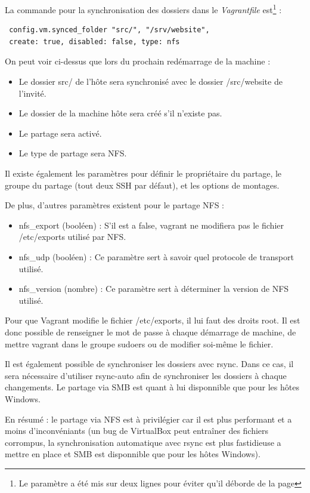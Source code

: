 \documentclass[12pt,a4paper]{article}
\begin{document}
La commande pour la synchronisation des dossiers dans le \textit{Vagrantfile} est\footnote{Le paramètre a été mis sur deux lignes pour éviter qu'il déborde de la page} :
\begin{lstlisting}
 config.vm.synced_folder "src/", "/srv/website", 
 create: true, disabled: false, type: nfs
\end{lstlisting}
On peut voir ci-dessus que lors du prochain redémarrage de la machine :
\begin{itemize}
	\item{Le dossier src/ de l'hôte sera synchronisé avec le dossier /src/website de l'invité.}
	\item{Le dossier de la machine hôte sera créé s'il n'existe pas.}
	\item{Le partage sera activé.}
	\item{Le type de partage sera NFS.}
\end{itemize}
Il existe également les paramètres pour définir le propriétaire du partage, le groupe du partage (tout deux SSH par défaut), et les options de montages.

De plus, d'autres paramètres existent pour le partage NFS : 
\begin{itemize}
	\item{nfs\_export (booléen) : S'il est a false, vagrant ne modifiera pas le fichier /etc/exports utilisé par NFS.}
	\item{nfs\_udp (booléen) : Ce paramètre sert à savoir quel protocole de transport utilisé.}
	\item{nfs\_version (nombre) : Ce paramètre sert à déterminer la version de NFS utilisé.}
\end{itemize}
Pour que Vagrant modifie le fichier /etc/exports, il lui faut des droits root. Il est donc possible de renseigner le mot de passe à chaque démarrage de machine, de mettre vagrant dans le groupe sudoers ou de modifier soi-même le fichier.

Il est également possible de synchroniser les dossiers avec rsync. Dans ce cas, il sera nécessaire d'utiliser rsync-auto afin de synchroniser les dossiers à chaque changements. Le partage via SMB est quant à lui disponnible que pour les hôtes Windows. 

En résumé : le partage via NFS est à privilégier car il est plus performant et a moins d'inconvéniants (un bug de VirtualBox peut entraîner des fichiers corrompus, la synchronisation automatique avec rsync est plus fastidieuse a mettre en place et SMB est disponnible que pour les hôtes Windows).
\end{document}
